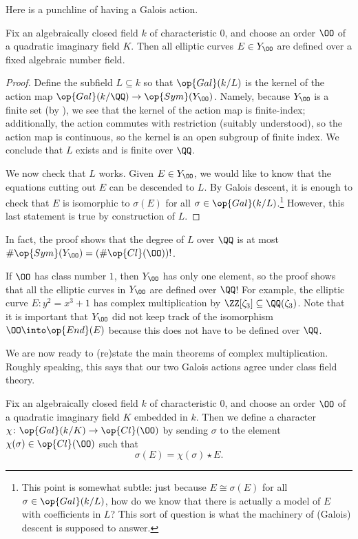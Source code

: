 \documentclass[../notes.tex]{subfiles}
\begin{document}
Here is a punchline of having a Galois action.
\begin{proposition}
	Fix an algebraically closed field $k$ of characteristic $0$, and choose an order $\OO$ of a quad\-ratic imaginary field $K$. Then all elliptic curves $E\in Y_\OO$ are defined over a fixed algebraic number field.
\end{proposition}
\begin{proof}
	Define the subfield $L\subseteq k$ so that $\op{Gal}(k/L)$ is the kernel of the action map $\op{Gal}(k/\QQ)\to\op{Sym}(Y_\OO)$. Namely, because $Y_\OO$ is a finite set (by ), we see that the kernel of the action map is finite-index; additionally, the action commutes with restriction (suitably understood), so the action map is continuous, so the kernel is an open subgroup of finite index. We conclude that $L$ exists and is finite over $\QQ$.

	We now check that $L$ works. Given $E\in Y_\OO$, we would like to know that the equations cutting out $E$ can be descended to $L$. By Galois descent, it is enough to check that $E$ is isomorphic to $\sigma(E)$ for all $\sigma\in\op{Gal}(k/L)$.\footnote{This point is somewhat subtle: just because $E\cong\sigma(E)$ for all $\sigma\in\op{Gal}(k/L)$, how do we know that there is actually a model of $E$ with coefficients in $L$? This sort of question is what the machinery of (Galois) descent is supposed to answer.} However, this last statement is true by construction of $L$.
\end{proof}
\begin{remark} \label{rem:cm-defined-over-bounded-field}
	In fact, the proof shows that the degree of $L$ over $\QQ$ is at most $\#\op{Sym}(Y_\OO)=(\#\op{Cl}(\OO))!$.
\end{remark}
\begin{example} \label{ex:cm-defined-over-q}
	If $\OO$ has class number $1$, then $Y_\OO$ has only one element, so the proof shows that all the elliptic curves in $Y_\OO$ are defined over $\QQ$! For example, the elliptic curve $E\colon y^2=x^3+1$ has complex multiplication by $\ZZ[\zeta_3]\subseteq\QQ(\zeta_3)$. Note that it is important that $Y_\OO$ did not keep track of the isomorphism $\OO\into\op{End}(E)$ because this does not have to be defined over $\QQ$.
\end{example}
We are now ready to (re)state the main theorems of complex multiplication. Roughly speaking, this says that our two Galois actions agree under class field theory.
\begin{notation}
	Fix an algebraically closed field $k$ of characteristic $0$, and choose an order $\OO$ of a quad\-ratic imaginary field $K$ embedded in $k$. Then we define a character $\chi\colon\op{Gal}(k/K)\to\op{Cl}(\OO)$ by sending $\sigma$ to the element $\chi(\sigma)\in\op{Cl}(\OO)$ such that
	\[\sigma(E)=\chi(\sigma)\star E.\]
\end{notation}
\end{document}
